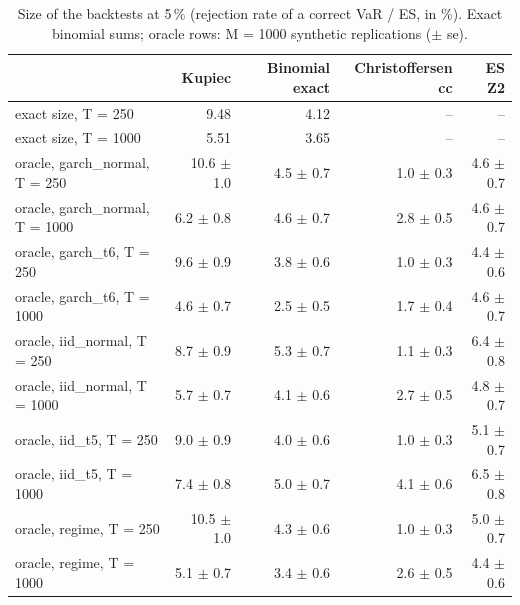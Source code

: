 \begin{table}[H]
\centering
\small
\caption{Size of the backtests at 5\,\% (rejection rate of a correct VaR / ES, in \%). Exact binomial sums; oracle rows: M = 1000 synthetic replications ($\pm$ se).}
\label{tab:T2_size}
\begin{tabular}{lrrrr}
\toprule
 & Kupiec & Binomial exact & Christoffersen cc & ES Z2 \\
\midrule
exact size, T = 250 & 9.48 & 4.12 & -- & -- \\
exact size, T = 1000 & 5.51 & 3.65 & -- & -- \\
\midrule
oracle, garch\_normal, T = 250 & 10.6 $\pm$ 1.0 & 4.5 $\pm$ 0.7 & 1.0 $\pm$ 0.3 & 4.6 $\pm$ 0.7 \\
oracle, garch\_normal, T = 1000 & 6.2 $\pm$ 0.8 & 4.6 $\pm$ 0.7 & 2.8 $\pm$ 0.5 & 4.6 $\pm$ 0.7 \\
oracle, garch\_t6, T = 250 & 9.6 $\pm$ 0.9 & 3.8 $\pm$ 0.6 & 1.0 $\pm$ 0.3 & 4.4 $\pm$ 0.6 \\
oracle, garch\_t6, T = 1000 & 4.6 $\pm$ 0.7 & 2.5 $\pm$ 0.5 & 1.7 $\pm$ 0.4 & 4.6 $\pm$ 0.7 \\
oracle, iid\_normal, T = 250 & 8.7 $\pm$ 0.9 & 5.3 $\pm$ 0.7 & 1.1 $\pm$ 0.3 & 6.4 $\pm$ 0.8 \\
oracle, iid\_normal, T = 1000 & 5.7 $\pm$ 0.7 & 4.1 $\pm$ 0.6 & 2.7 $\pm$ 0.5 & 4.8 $\pm$ 0.7 \\
oracle, iid\_t5, T = 250 & 9.0 $\pm$ 0.9 & 4.0 $\pm$ 0.6 & 1.0 $\pm$ 0.3 & 5.1 $\pm$ 0.7 \\
oracle, iid\_t5, T = 1000 & 7.4 $\pm$ 0.8 & 5.0 $\pm$ 0.7 & 4.1 $\pm$ 0.6 & 6.5 $\pm$ 0.8 \\
oracle, regime, T = 250 & 10.5 $\pm$ 1.0 & 4.3 $\pm$ 0.6 & 1.0 $\pm$ 0.3 & 5.0 $\pm$ 0.7 \\
oracle, regime, T = 1000 & 5.1 $\pm$ 0.7 & 3.4 $\pm$ 0.6 & 2.6 $\pm$ 0.5 & 4.4 $\pm$ 0.6 \\
\bottomrule
\end{tabular}
\end{table}
